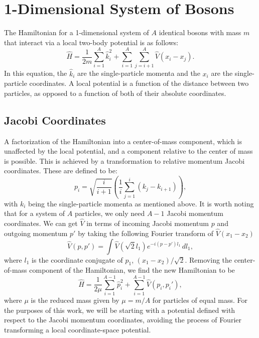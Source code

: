 \section{1-Dimensional System of Bosons}

The Hamiltonian for a 1-dimensional system of $A$ identical bosons with mass $m$ that interact via a local two-body potential is as follows:
\begin{equation}
\hat{H} = \frac{1}{2 m} \sum_{i=1}^A \hat{k}_i^2 + \sum_{i=1}^A\sum_{j=i+1}^{A} \hat{V}(x_i - x_j).
\end{equation}
In this equation, the $\hat{k}_i$ are the single-particle momenta and the $x_i$ are the single-particle coordinates. A local potential is a function of the distance between two particles, as opposed to a function of both of their absolute coordinates.

\subsection{Jacobi Coordinates}

A factorization of the Hamiltonian into a center-of-mass component, which is unaffected by the local potential, and a component relative to the center of mass is possible. This is achieved by a transformation to relative momentum Jacobi coordinates. These are defined to be:
\begin{equation}
p_i = \sqrt{\frac{i}{i+1}} \left(\frac{1}{i} \sum_{j=1}^{i}(k_j - k_{i+1})\right),
\end{equation}
with $k_i$ being the single-particle momenta as mentioned above. It is worth noting that for a system of $A$ particles, we only need $A-1$ Jacobi momentum coordinates. We can get $\hat{V}$ in terms of incoming Jacobi momentum $p$ and outgoing momentum $p'$ by taking the following Fourier transform of $\hat{V}(x_1 - x_2)$
\begin{equation}
\hat{V}(p, p') = \int \hat{V}(\sqrt{2} l_1) e^{- i (p - p') l_1} \,dl_1,
\end{equation}
where $l_1$ is the coordinate conjugate of $p_1$, $(x_1 - x_2)/\sqrt{2}$. Removing the center-of-mass component of the Hamiltonian, we find the new Hamiltonian to be
\begin{equation}
\hat{H} = \frac{1}{2 \mu} \sum_{i=1}^{A-1} \hat{p}_i^2 + \sum_{i=1}^{A-1}\hat{V}(p_i, p_i'),
\end{equation}
where $\mu$ is the reduced mass given by $\mu = m / A$ for particles of equal mass. For the purposes of this work, we will be starting with a potential defined with respect to the Jacobi momentum coordinates, avoiding the process of Fourier transforming a local coordinate-space potential.

